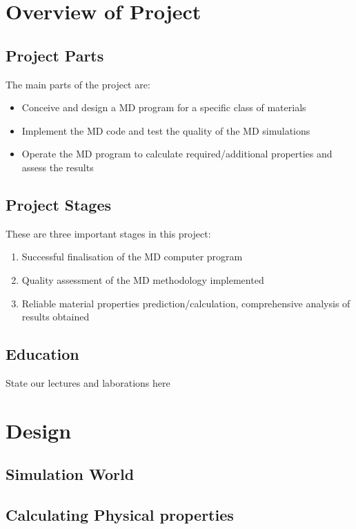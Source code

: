 \documentclass[12pt,a4paper]{article}
\begin{document}
\newpage
\section{Overview of Project}
\label{sec:Overview}

\subsection{Project Parts}
The main parts of the project are:
\begin{itemize}
\item Conceive and design a MD program for a specific class of materials
\item Implement the MD code and test the quality of the MD simulations
\item Operate the MD program to calculate required/additional properties and assess the results
\end{itemize}

\subsection{Project Stages}
These are three important stages in this project:
\begin{enumerate}
\item Successful finalisation of the MD computer program
\item Quality assessment of the MD methodology implemented
\item Reliable material properties prediction/calculation, comprehensive analysis of results obtained
\end{enumerate}

\subsection{Education}
State our lectures and laborations here

\newpage
\section{Design}

\subsection{Simulation World}

\subsection{Calculating Physical properties}
\end{document}
